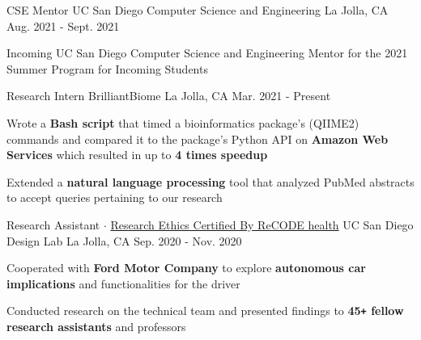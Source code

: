 

\begin{cventries}

  \cventry
    {CSE Mentor} %
    {UC San Diego Computer Science and Engineering} %
    {La Jolla, CA} %
    {Aug. 2021 - Sept. 2021} %
    {
      \begin{cvitems} %
        \item {Incoming UC San Diego Computer Science and Engineering Mentor for the 2021 Summer Program for Incoming Students}
      \end{cvitems}
    }

  \cventry
    {Research Intern} %
    {BrilliantBiome} %
    {La Jolla, CA} %
    {Mar. 2021 - Present} %
    {
      \begin{cvitems} %
        \item { Wrote a \textbf{Bash script} that timed a bioinformatics package's (QIIME2) commands and compared it to the package's Python API on \textbf{Amazon Web Services} which resulted in up to \textbf{4 times speedup} }
        \item { Extended a \textbf{natural language processing} tool that analyzed PubMed abstracts to accept queries pertaining to our research}
      \end{cvitems}
    }

  \cventry
    {Research Assistant $\cdot$ \href{https://drive.google.com/file/d/1H6umxRDQHrhhIYeaZPvLyXRLWNCTGQqS/view?usp=sharing}{\textcolor{awesome-skyblue}{Research Ethics Certified By ReCODE health}}} %
    {UC San Diego Design Lab} %
    {La Jolla, CA} %
    {Sep. 2020 - Nov. 2020} %
    {
      \begin{cvitems} %
        \item Cooperated with \textbf{Ford Motor Company} to explore \textbf{autonomous car implications} and functionalities for the driver
        \item Conducted research on the technical team and presented findings to \textbf{45\texttt{+} fellow research assistants} and professors
      \end{cvitems}
    }


\end{cventries}
